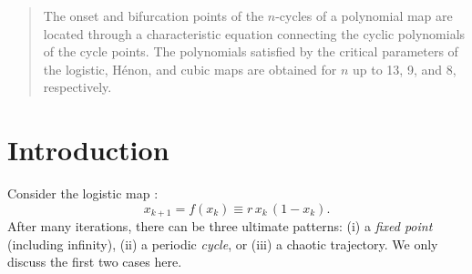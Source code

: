 \documentclass{ws-ijbc}
\begin{document}
\begin{abstract}
The onset and bifurcation points of the $n$-cycles of
  a polynomial map are located
  through a characteristic equation
  connecting the cyclic polynomials of the cycle points.
The polynomials satisfied by the critical parameters
  of the logistic, H\'enon, and cubic maps are obtained
  for $n$ up to 13, 9, and 8,
  respectively.
\end{abstract}




\twocolumn

%
%
\section{Introduction}
%
%

Consider the logistic map \cite{may, strogatz}:
%
\begin{equation}
  x_{k+1} = f(x_k) \equiv r \, x_k \, ( 1 - x_k ).
\label{eq:logmap}
\end{equation}
%
%
%
%
%
After many iterations, there can be three ultimate patterns:
  (i) a \emph{fixed point} (including infinity),
  (ii) a periodic \emph{cycle},
or
  (iii) a chaotic trajectory.
We only discuss the first two cases here.
\end{document}

